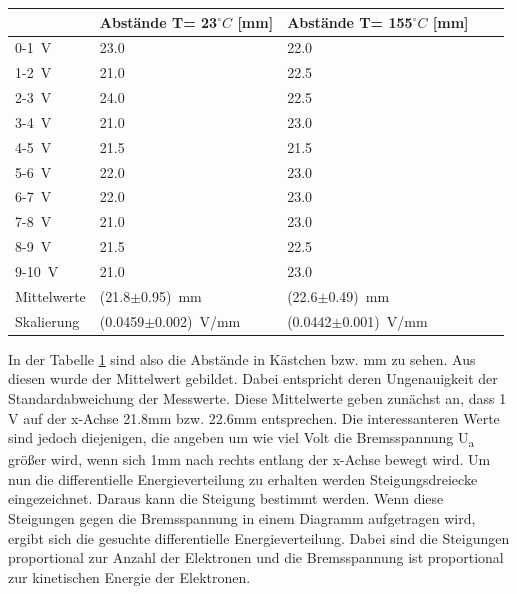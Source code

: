 \begin{minipage}{\linewidth}
    \begin{table}[H]
        \centering
    \begin{tabular}{lllll}
        \toprule
         & Abstände T= 23$^\circ C$ [mm] & Abstände T= 155$^\circ C$ [mm]\\
        \midrule
        0-1\, V  & 23.0 & 22.0     \\
        1-2\, V  & 21.0 & 22.5   \\
        2-3\, V  & 24.0 & 22.5   \\
        3-4\, V  & 21.0 & 23.0     \\
        4-5\, V  & 21.5 & 21.5 \\
        5-6\, V  & 22.0 & 23.0     \\
        6-7\, V  & 22.0 & 23.0     \\
        7-8\, V  & 21.0 & 23.0     \\
        8-9\, V  & 21.5 & 22.5 \\
        9-10\, V & 21.0 & 23.0     \\
        \midrule
        Mittelwerte & (21.8$\pm$0.95)\, mm & (22.6$\pm$0.49)\, mm \\
        Skalierung & (0.0459$\pm$0.002)\, V/mm & (0.0442$\pm$0.001)\, V/mm \\
        \bottomrule
        
    \end{tabular}
    
    \label{tab:1}
    \end{table}
    \end{minipage}

\noindent In der Tabelle \ref{tab:1} sind also die Abstände in Kästchen bzw. mm zu sehen. Aus diesen wurde der Mittelwert gebildet. Dabei entspricht deren Ungenauigkeit der Standardabweichung der Messwerte. Diese Mittelwerte geben zunächst an, dass 1\, V auf der x-Achse 21.8mm bzw. 22.6mm entsprechen. Die interessanteren Werte sind jedoch diejenigen, die angeben um wie viel Volt die Bremsspannung U\textsubscript{a} größer wird, wenn sich 1mm nach rechts entlang der x-Achse bewegt wird. 
\noindent Um nun die differentielle Energieverteilung zu erhalten werden Steigungsdreiecke eingezeichnet. Daraus kann die Steigung bestimmt werden. Wenn diese Steigungen gegen die Bremsspannung in einem Diagramm aufgetragen wird, ergibt sich die gesuchte differentielle Energieverteilung. Dabei sind die Steigungen proportional zur Anzahl der Elektronen und die Bremsspannung ist proportional zur kinetischen Energie der Elektronen. 

